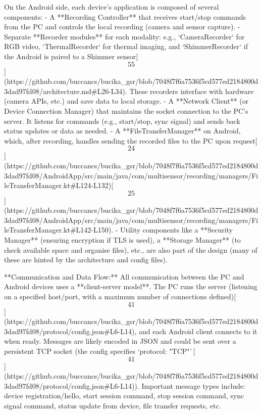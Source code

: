 \documentclass[12pt,a4paper]{article}
\begin{document}
On the Android side, each device's application is composed of several
components: - A **Recording Controller** that receives start/stop
commands from the PC and controls the local recording (camera and sensor
capture). - Separate **Recorder modules** for each modality: e.g.,
`CameraRecorder` for RGB video, `ThermalRecorder` for thermal imaging,
and `ShimmerRecorder` if the Android is paired to a Shimmer
sensor[\[55\]](https://github.com/buccancs/bucika_gsr/blob/7048f7f6a7536f5cd577ed2184800d3dad97fd08/architecture.md#L26-L34).
These recorders interface with hardware (camera APIs, etc.) and save
data to local storage. - A **Network Client** (or Device Connection
Manager) that maintains the socket connection to the PC's server. It
listens for commands (e.g., start/stop, sync signal) and sends back
status updates or data as needed. - A **FileTransferManager** on
Android, which, after recording, handles sending the recorded files to
the PC upon
request[\[24\]](https://github.com/buccancs/bucika_gsr/blob/7048f7f6a7536f5cd577ed2184800d3dad97fd08/AndroidApp/src/main/java/com/multisensor/recording/managers/FileTransferManager.kt#L124-L132)[\[25\]](https://github.com/buccancs/bucika_gsr/blob/7048f7f6a7536f5cd577ed2184800d3dad97fd08/AndroidApp/src/main/java/com/multisensor/recording/managers/FileTransferManager.kt#L142-L150). -
Utility components like a **Security Manager** (ensuring encryption if
TLS is used), a **Storage Manager** (to check available space and
organise files), etc., are also part of the design (many of these are
hinted by the architecture and config files).

**Communication and Data Flow:** All communication between the PC and
Android devices uses a **client-server model**. The PC runs the server
(listening on a specified host/port, with a maximum number of
connections
defined)[\[41\]](https://github.com/buccancs/bucika_gsr/blob/7048f7f6a7536f5cd577ed2184800d3dad97fd08/protocol/config.json#L6-L14),
and each Android client connects to it when ready. Messages are likely
encoded in JSON and could be sent over a persistent TCP socket (the
config specifies
`protocol: "TCP"`[\[41\]](https://github.com/buccancs/bucika_gsr/blob/7048f7f6a7536f5cd577ed2184800d3dad97fd08/protocol/config.json#L6-L14)).
Important message types include: device registration/hello, start
session command, stop session command, sync signal command, status
update from device, file transfer requests, etc.
\end{document}
